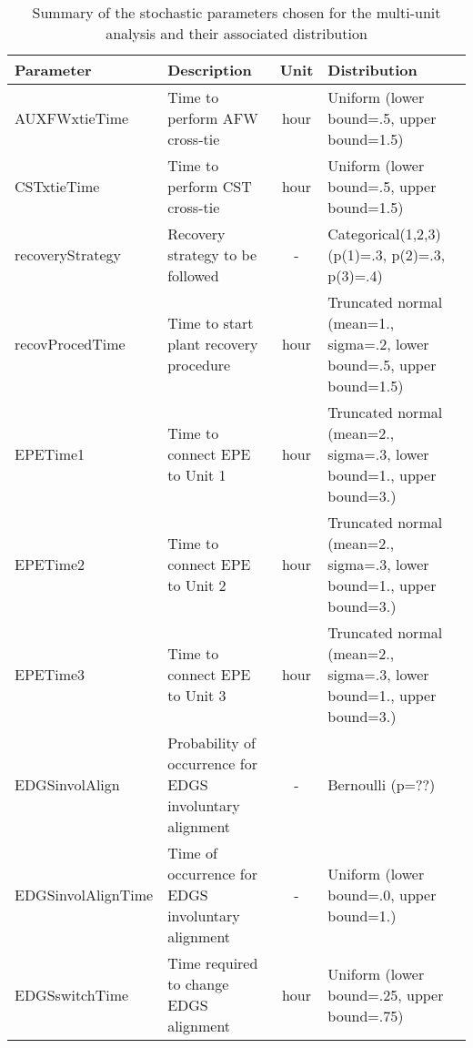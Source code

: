 \begin{table}
  \centering
  \begin{center}
      \begin{tabular}{ | l | p{5cm} | c | p{5cm} |}
        \hline
         Parameter          & Description                      & Unit   & Distribution                                         \\ \hline \hline
         AUXFWxtieTime      & Time to perform AFW cross-tie    & hour   & Uniform (lower bound=.5, upper bound=1.5)            \\ \hline
         CSTxtieTime        & Time to perform CST cross-tie    & hour   & Uniform (lower bound=.5, upper bound=1.5)            \\ \hline
         recoveryStrategy   & Recovery strategy to be followed & -      & Categorical(1,2,3) (p(1)=.3, p(2)=.3, p(3)=.4)       \\ \hline
         recovProcedTime    & Time to start plant recovery procedure    & hour        & Truncated normal (mean=1., sigma=.2, lower bound=.5, upper bound=1.5)       \\ \hline
         EPETime1           & Time to connect EPE to Unit 1    & hour   & Truncated normal (mean=2., sigma=.3, lower bound=1., upper bound=3.)   \\ \hline
         EPETime2           & Time to connect EPE to Unit 2    & hour   & Truncated normal (mean=2., sigma=.3, lower bound=1., upper bound=3.)   \\ \hline
         EPETime3           & Time to connect EPE to Unit 3    & hour   & Truncated normal (mean=2., sigma=.3, lower bound=1., upper bound=3.)   \\ \hline
         EDGSinvolAlign     & Probability of occurrence for EDGS involuntary alignment & -      & Bernoulli (p=??)                               \\ \hline
         EDGSinvolAlignTime & Time of occurrence for EDGS involuntary alignment        & -      & Uniform (lower bound=.0, upper bound=1.)       \\ \hline
         EDGSswitchTime     & Time required to change EDGS alignment       & hour  & Uniform (lower bound=.25, upper bound=.75)                  \\ 
        \hline
      \end{tabular}
  \end{center}
  \caption{Summary of the stochastic parameters chosen for the multi-unit analysis and their associated distribution}
  \label{tab:stochasticParameters1}
\end{table}

